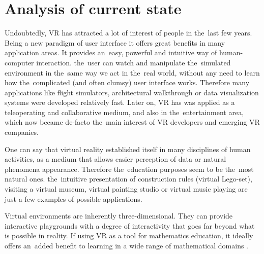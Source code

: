 
\section{Analysis of current state}
Undoubtedly, VR has attracted a lot of interest of people in the~last few years. Being a new paradigm of user interface it offers great benefits in many application areas. It provides an~easy, powerful and intuitive way of human-computer interaction. the~user can watch and manipulate the~simulated environment in the~same way we act in the~real world, without any need to learn how the~complicated (and often clumsy) user interface works. Therefore many applications like flight simulators, architectural walkthrough or data visualization systems were developed relatively fast. Later on, VR has was applied as a teleoperating and collaborative medium, and also in the~entertainment area, which now became de-facto the~main interest of VR developers and emerging VR companies.

One can say that virtual reality established itself in many disciplines of human activities, as a medium that allows easier perception of data or natural phenomena appearance. Therefore the~education purposes seem to be the~most natural ones. the~intuitive presentation of construction rules (virtual Lego-set), visiting a virtual museum, virtual painting studio or virtual music playing \citep{loeffler} are just a few examples of possible applications. 

Virtual environments are inherently three-dimensional. They can provide interactive playgrounds with a degree of interactivity that goes far beyond what is possible in reality. If using VR as a tool for mathematics education, it ideally offers an~added benefit to learning in a wide range of mathematical domains \citep{kaufmann}.

